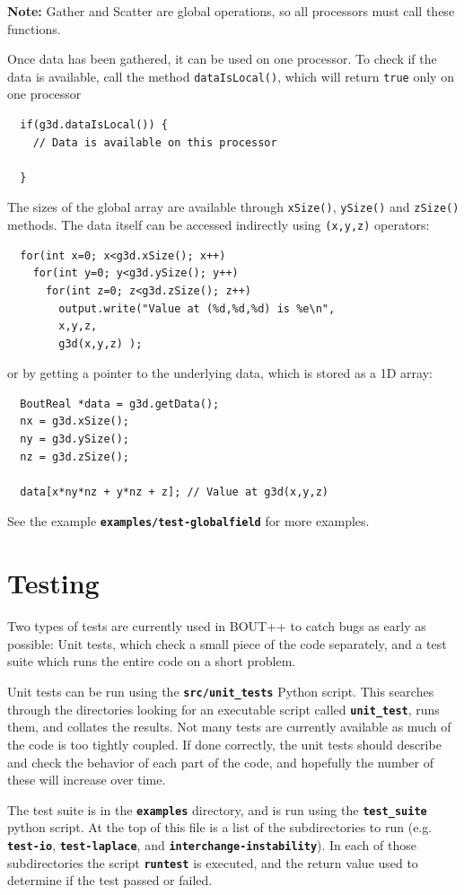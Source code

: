 \documentclass[12pt]{article}
\newcommand{\file}[1]{\texttt{\bf #1}}
\begin{document}
{\bf Note:} Gather and Scatter are global operations, so all processors must call these functions.

Once data has been gathered, it can be used on one processor. To check if the data is available, call
the method \lstinline!dataIsLocal()!, which will return \lstinline!true! only on one processor
\begin{lstlisting}
  if(g3d.dataIsLocal()) {
    // Data is available on this processor

  }
\end{lstlisting}
The sizes of the global array are available through \lstinline!xSize()!, \lstinline!ySize()! and \lstinline!zSize()!
methods. The data itself can be accessed indirectly using \lstinline!(x,y,z)! operators:
\begin{lstlisting}
  for(int x=0; x<g3d.xSize(); x++)
    for(int y=0; y<g3d.ySize(); y++)
      for(int z=0; z<g3d.zSize(); z++)
        output.write("Value at (%d,%d,%d) is %e\n",
        x,y,z,
        g3d(x,y,z) );
\end{lstlisting}
or by getting a pointer to the underlying data, which is stored as a 1D array:
\begin{lstlisting}
  BoutReal *data = g3d.getData();
  nx = g3d.xSize();
  ny = g3d.ySize();
  nz = g3d.zSize();

  data[x*ny*nz + y*nz + z]; // Value at g3d(x,y,z)
\end{lstlisting}

See the example \file{examples/test-globalfield} for more examples.

\section{Testing}

Two types of tests are currently used in BOUT++ to catch bugs as early as possible: Unit tests, which
check a small piece of the code separately, and a test suite which runs the entire code on a short problem.

Unit tests can be run using the \file{src/unit\_tests} Python script. This searches through the directories
looking for an executable script called \file{unit\_test}, runs them, and collates the results. Not many
tests are currently available as much of the code is too tightly coupled. If done correctly, the unit tests
should describe and check the behavior of each part of the code, and hopefully the number of these will increase
over time.

The test suite is in the \file{examples} directory, and is run using the \file{test\_suite} python script. At the top
of this file is a list of the subdirectories to run (e.g. \file{test-io}, \file{test-laplace}, and \file{interchange-instability}). In each of those subdirectories the script \file{runtest} is executed, and the return value used to determine if the test passed or failed.
\end{document}
